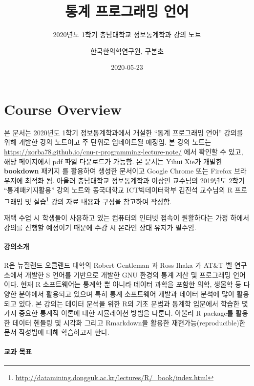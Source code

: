 \documentclass[
  11pt,
]{krantz}
\title{통계 프로그래밍 언어}
\subtitle{2020년도 1학기 충남대학교 정보통계학과 강의 노트}
\author{한국한의학연구원, 구본초}
\date{2020-05-23}
\renewcommand{\href}[2]{#2\footnote{\url{#1}}}
\let\BeginKnitrBlock\begin \let\EndKnitrBlock\end
\begin{document}
\maketitle

{
\hypersetup{linkcolor=}
\setcounter{tocdepth}{2}
\tableofcontents
}
\listoftables
\listoffigures
\hypertarget{overview}{%
\chapter*{Course Overview}\label{overview}}


\BeginKnitrBlock{rmdnote}
본 문서는 2020년도 1학기 정보통계학과에서 개설한 ``통계 프로그래밍 언어'' 강의를 위해 개발한 강의 노트이고 주 단위로 업데이트될 예정임. 본 강의 노트는 \url{https://zorba78.github.io/cnu-r-programming-lecture-note/} 에서 확인할 수 있고, 해당 페이지에서 pdf 파일 다운로드가 가능함. 본 문서는 Yihui Xie가 개발한 \textbf{bookdown} 패키지 \citep{xie-2016}를 활용하여 생성한 문서이고 Google Chrome 또는 Firefox 브라우저에 최적화 됨. 아울러 충남대학교 정보통계학과 이상인 교수님의 2019년도 2학기 ``통계패키지활용'' 강의 노트와 동국대학교 ICT빅데이터학부 김진석 교수님의 \href{http://datamining.dongguk.ac.kr/lectures/R/_book/index.html}{R 프로그래밍 및 실습} 강의 자료 내용과 구성을 참고하여 작성함.

재택 수업 시 학생들이 사용하고 있는 컴퓨터의 인터넷 접속이 원활하다는 가정 하에서 강의를 진행할 예정이기 때문에 수강 시 온라인 상태 유지가 필수임.
\EndKnitrBlock{rmdnote}

\hypertarget{intro-lec}{%
\subsubsection*{강의소개}\label{intro-lec}}


R은 뉴질랜드 오클랜드 대학의 Robert Gentleman 과 Ross Ihaka 가 AT\&T 벨 연구소에서 개발한 S 언어를 기반으로 개발한 GNU 환경의 통계 계산 및 프로그래밍 언어이다. 현재 R 소프트웨어는 통계학 뿐 아니라 데이터 과학을 포함한 의학, 생물학 등 다양한 분야에서 활용되고 있으며 특히 통계 소프트웨어 개발과 데이터 분석에 많이 활용되고 있다. 본 강의는 데이터 분석을 위한 R의 기초 문법과 통계학 입문에서 학습한 몇 가지 중요한 통계적 이론에 대한 시뮬레이션 방법을 다룬다. 아울러 R package를 활용한 데이터 헨들링 및 시각화 그리고 Rmarkdown을 활용한 재현가능(reproducible)한 문서 작성법에 대해 학습하고자 한다.

\hypertarget{purpose-course}{%
\subsubsection*{교과 목표}\label{purpose-course}}
\end{document}
